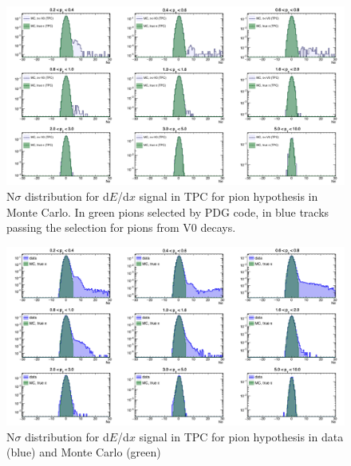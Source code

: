 \begin{figure}[!h]
 \centering
 \includegraphics[angle=0, width=15cm]{./FigCap5/PionTPC_MC.png}
 \caption{N$\sigma$ distribution for d$E$/d$x$ signal in TPC for pion hypothesis in Monte Carlo. In green pions selected by PDG code, in blue tracks passing the selection for pions from V0 decays.}
 \label{fig:MCPionsTPC} 
\end{figure}

\begin{figure}[!h]
 \centering
 \includegraphics[angle=0, width=15cm]{./FigCap5/PionTPC_DataMC.png}
 \caption{N$\sigma$ distribution for d$E$/d$x$ signal in TPC for pion hypothesis in data (blue) and Monte Carlo (green)}
 \label{fig:DataPionsTPC} 
\end{figure}

